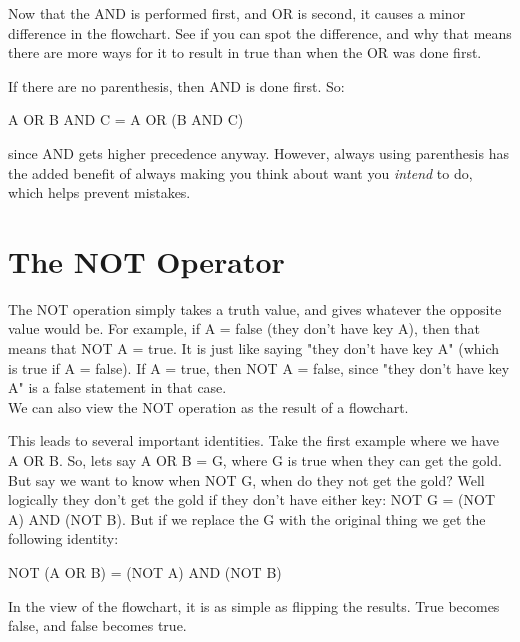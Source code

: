 Now that the AND is performed first, and OR is second, it causes a minor difference in the flowchart. See if you can spot the difference, and why that means there are more ways for it to result in true than when the OR was done first.

\begin{center} \end{center}

If there are no parenthesis, then AND is done first. So:

\begin{center}A OR B AND C = A OR (B AND C)\end{center}
	
since AND gets higher precedence anyway. However, always using parenthesis has the added benefit of always making you think about want you \textit{intend} to do, which helps prevent mistakes.

\section{The NOT Operator}

The NOT operation simply takes a truth value, and gives whatever the opposite value would be. For example, if A = false (they don't have key A), then that means that NOT A = true. It is just like saying "they don't have key A" (which is true if A = false). If A = true, then NOT A = false, since "they don't have key A" is a false statement in that case.\\

We can also view the NOT operation as the result of a flowchart.

\begin{center} \end{center}

This leads to several important identities. Take the first example where we have A OR B. So, lets say A OR B = G, where G is true when they can get the gold. But say we want to know when NOT G, when do they not get the gold? Well logically they don't get the gold if they don't have either key: NOT G = (NOT A) AND (NOT B). But if we replace the G with the original thing we get the following identity:

\begin{center}
	NOT (A OR B) = (NOT A) AND (NOT B)
\end{center}

In the view of the flowchart, it is as simple as flipping the results. True becomes false, and false becomes true. 

